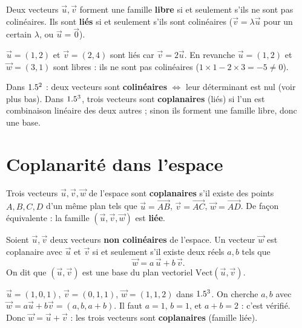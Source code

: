 \begin{propriete}
Deux vecteurs $\vec u,\vec v$ forment une famille \textbf{libre} si et seulement s'ils ne sont
pas colinéaires. Ils sont \textbf{liés} si et seulement s'ils sont colinéaires
($\vec v=\lambda\vec u$ pour un certain $\lambda$, ou $\vec u=\vec 0$).
\end{propriete}

\begin{exemple}
$\vec u=(1,2)$ et $\vec v=(2,4)$ sont liés car $\vec v=2\vec u$. En revanche $\vec u=(1,2)$ et
$\vec w=(3,1)$ sont libres : ils ne sont pas colinéaires ($1\times1-2\times3=-5\neq0$).
\end{exemple}

\begin{aretenir}
Dans $1.5^2$ : deux vecteurs sont \textbf{colinéaires} $\Leftrightarrow$ leur déterminant est nul
(voir plus bas). Dans $1.5^3$, trois vecteurs sont \textbf{coplanaires} (liés) si l'un est
combinaison linéaire des deux autres ; sinon ils forment une famille libre, donc une base.
\end{aretenir}

\section{Coplanarité dans l'espace}

\begin{definition}
Trois vecteurs $\vec u,\vec v,\vec w$ de l'espace sont \textbf{coplanaires} s'il existe des points
$A,B,C,D$ d'un même plan tels que $\vec u=\vec{AB}$, $\vec v=\vec{AC}$, $\vec w=\vec{AD}$.
De façon équivalente : la famille $(\vec u,\vec v,\vec w)$ est \textbf{liée}.
\end{definition}

\begin{propriete}
Soient $\vec u,\vec v$ deux vecteurs \textbf{non colinéaires} de l'espace. Un vecteur $\vec w$ est
coplanaire avec $\vec u$ et $\vec v$ si et seulement s'il existe deux réels $a,b$ tels que
\[
\vec w=a\,\vec u+b\,\vec v.
\]
On dit que $(\vec u,\vec v)$ est une base du plan vectoriel $\mathrm{Vect}(\vec u,\vec v)$.
\end{propriete}

\begin{exemple}
$\vec u=(1,0,1)$, $\vec v=(0,1,1)$, $\vec w=(1,1,2)$ dans $1.5^3$. On cherche $a,b$ avec
$\vec w=a\vec u+b\vec v=(a,b,a+b)$. Il faut $a=1$, $b=1$, et $a+b=2$ : c'est vérifié. Donc
$\vec w=\vec u+\vec v$ : les trois vecteurs sont \textbf{coplanaires} (famille liée).
\end{exemple}

